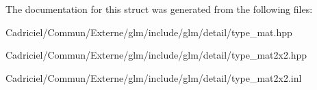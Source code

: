 The documentation for this struct was generated from the following files\+:\begin{DoxyCompactItemize}
\item 
Cadriciel/\+Commun/\+Externe/glm/include/glm/detail/type\+\_\+mat.\+hpp\item 
Cadriciel/\+Commun/\+Externe/glm/include/glm/detail/type\+\_\+mat2x2.\+hpp\item 
Cadriciel/\+Commun/\+Externe/glm/include/glm/detail/type\+\_\+mat2x2.\+inl\end{DoxyCompactItemize}
